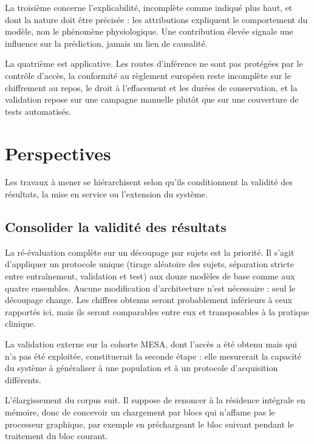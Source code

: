 La troisième concerne l'explicabilité, incomplète comme indiqué plus haut, et dont la
nature doit être précisée : les attributions expliquent le comportement du
modèle, non le phénomène physiologique. Une contribution élevée signale une influence
sur la prédiction, jamais un lien de causalité.

La quatrième est applicative. Les routes d'inférence ne sont pas protégées par
le contrôle d'accès, la conformité au règlement européen reste incomplète sur le
chiffrement au repos, le droit à l'effacement et les durées de conservation, et la
validation repose sur une campagne manuelle plutôt que sur une couverture de tests
automatisés.

\section*{Perspectives}

Les travaux à mener se hiérarchisent selon qu'ils conditionnent la
validité des résultats, la mise en service ou l'extension du système.

\subsection*{Consolider la validité des résultats}

La ré-évaluation complète sur un découpage par sujets est la priorité.
Il s'agit d'appliquer un protocole unique (tirage aléatoire des sujets, séparation
stricte entre entraînement, validation et test) aux douze modèles de base comme aux
quatre ensembles. Aucune modification d'architecture n'est nécessaire : seul le
découpage change. Les chiffres obtenus seront probablement inférieurs à ceux rapportés
ici, mais ils seront comparables entre eux et transposables à la pratique clinique.

La validation externe sur la cohorte MESA, dont l'accès a été obtenu mais qui
n'a pas été exploitée, constituerait la seconde étape : elle mesurerait la capacité du
système à généraliser à une population et à un protocole d'acquisition différents.

L'élargissement du corpus suit. Il suppose de renoncer à la
résidence intégrale en mémoire, donc de concevoir un chargement par blocs qui n'affame
pas le processeur graphique, par exemple en préchargeant le bloc suivant pendant le
traitement du bloc courant.

